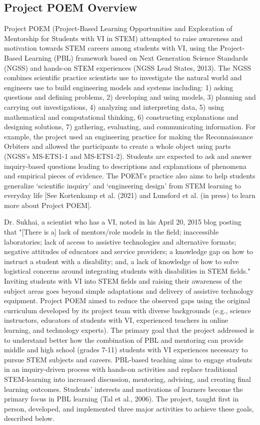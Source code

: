 \documentclass[11pt]{sig-alternate}
\begin{document}
\begin{large}
\section*{Project POEM Overview}

Project POEM (Project-Based Learning Opportunities and Exploration of Mentorship for Students with VI in STEM) attempted to raise awareness and motivation towards STEM careers among students with VI, using the Project-Based Learning (PBL) framework based on Next Generation Science Standards (NGSS) and hands-on STEM experiences (NGSS Lead States, 2013). The NGSS combines scientific practice scientists use to investigate the natural world and engineers use to build engineering models and systems including: 1) asking questions and defining problems, 2) developing and using models, 3) planning and carrying out investigations, 4) analyzing and interpreting data, 5) using mathematical and computational thinking, 6) constructing explanations and designing solutions, 7) gathering, evaluating, and communicating information. For example, the project used an engineering practice for making the Reconnaissance Orbiters and allowed the participants to create a whole object using parts (NGSS’s MS-ETS1-1 and MS-ETS1-2). Students are expected to ask and answer inquiry-based questions leading to descriptions and explanations of phenomena and empirical pieces of evidence. The POEM’s practice also aims to help students generalize ‘scientific inquiry’ and ‘engineering design’ from STEM learning to everyday life [See Kortenkamp et al. (2021) and Lunsford et al. (in press) to learn more about Project POEM].

Dr. Sukhai, a scientist who has a VI, noted in his April 20, 2015 blog posting that "[There is a] lack of mentors/role models in the field; inaccessible laboratories; lack of access to assistive technologies and alternative formats; negative attitudes of educators and service providers; a knowledge gap on how to instruct a student with a disability; and, a lack of knowledge of how to solve logistical concerns around integrating students with disabilities in STEM fields." Inviting students with VI into STEM fields and raising their awareness of the subject areas goes beyond simple adaptations and delivery of assistive technology equipment. Project POEM aimed to reduce the observed gaps using the original curriculum developed by its project team with diverse backgrounds (e.g., science instructors, educators of students with VI, experienced teachers in online learning, and technology experts). The primary goal that the project addressed is to understand better how the combination of PBL and mentoring can provide middle and high school (grades 7-11) students with VI experiences necessary to pursue STEM subjects and careers. PBL-based teaching aims to engage students in an inquiry-driven process with hands-on activities and replace traditional STEM-learning into increased discussion, mentoring, advising, and creating final learning outcomes. Students’ interests and motivations of learners become the primary focus in PBL learning (Tal et al., 2006). The project, taught first in person, developed, and implemented three major activities to achieve these goals, described below. 


\end{large}
\end{document}
